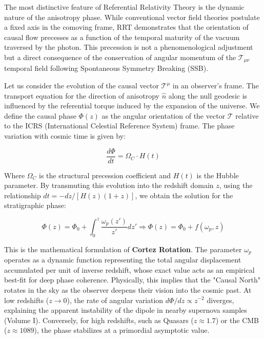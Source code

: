 \documentclass[12pt, a4paper]{article}
\begin{document}
The most distinctive feature of Referential Relativity Theory is the dynamic nature of the anisotropy phase. While conventional vector field theories postulate a fixed axis in the comoving frame, RRT demonstrates that the orientation of causal flow precesses as a function of the temporal maturity of the vacuum traversed by the photon. This precession is not a phenomenological adjustment but a direct consequence of the conservation of angular momentum of the $\mathcal{T}_{\mu\nu}$ temporal field following Spontaneous Symmetry Breaking (SSB).

Let us consider the evolution of the causal vector $\mathcal{T}^\mu$ in an observer's frame. The transport equation for the direction of anisotropy $\hat{n}$ along the null geodesic is influenced by the referential torque induced by the expansion of the universe. We define the causal phase $\Phi(z)$ as the angular orientation of the vector $\mathcal{T}$ relative to the ICRS (International Celestial Reference System) frame. The phase variation with cosmic time is given by:

\begin{equation}
\frac{d\Phi}{dt} = \Omega_{C} \cdot H(t)
\end{equation}

Where $\Omega_{C}$ is the structural precession coefficient and $H(t)$ is the Hubble parameter. By transmuting this evolution into the redshift domain $z$, using the relationship $dt = -dz / [H(z)(1+z)]$, we obtain the solution for the stratigraphic phase:

\begin{equation}
\Phi(z) = \Phi_{0} + \int_{0}^{z} \frac{\omega_{p}(z')}{z'} dz' \Rightarrow \Phi(z) = \Phi_{0} + f(\omega_{p}, z)
\end{equation}

This is the mathematical formulation of \textbf{Cortez Rotation}. The parameter $\omega_p$ operates as a dynamic function representing the total angular displacement accumulated per unit of inverse redshift, whose exact value acts as an empirical best-fit for deep phase coherence. Physically, this implies that the "Causal North" rotates in the sky as the observer deepens their vision into the cosmic past. At low redshifts ($z \rightarrow 0$), the rate of angular variation $d\Phi/dz \propto z^{-2}$ diverges, explaining the apparent instability of the dipole in nearby supernova samples (Volume I). Conversely, for high redshifts, such as Quasars ($z \approx 1.7$) or the CMB ($z \approx 1089$), the phase stabilizes at a primordial asymptotic value.
\end{document}
